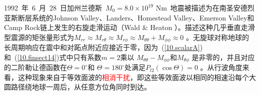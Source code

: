 1992~年~6~月~28~日加州兰德斯~$M_0=8.0\times 10^{19}$ N\hspace{0.6 mm}m~地震被描述为在南圣安德烈亚斯断层系统的Johnson Valley、Landers、Homestead Valley、Emerson Valley和Camp Rock链上发生的右旋走滑运动（Wald \& Heaton \citeyear{wald&heaton94}）。描述这种几乎垂直走滑型震源的矩张量形式为$M_{rr}\approx M_{r\theta}\approx M_{r\phi}
\approx M_{\theta\theta}+M_{\phi\phi}\approx 0$ 。无旋球对称地球的长周期响应在震中和对跖点附近应接近于零，因为~(\ref{10.scalarA})和~(\ref{10.finsect14})式中只有系数$m=2$乘以 $M_{\theta\theta}-M_{\phi\phi}$和$M_{\theta\phi}$ 是非零的，并且对应的二阶勒让德函数在$\Theta=0^{\circ}$和 $\Theta=180^{\circ}$处满足$P_{l2}(\cos\Theta)=0$ 。从行波角度来看，这种现象来自于等效面波的\textcolor{red}{相消干扰}，即这些等效面波以相同的相速沿每个大圆路径绕地球一周后，从任意方位角同时到达。
